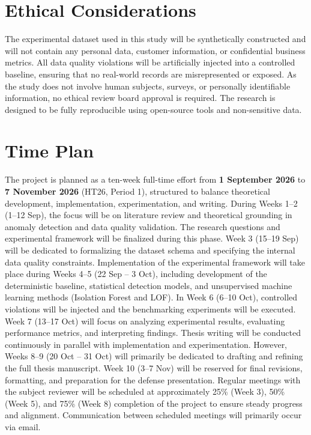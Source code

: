 \documentclass[a4paper, 12pt]{article} %
\begin{document}
\section{Ethical Considerations}
The experimental dataset used in this study will be synthetically constructed and will not contain any personal data, customer information, or confidential business metrics. All data quality violations will be artificially injected into a controlled baseline, ensuring that no real-world records are misrepresented or exposed. As the study does not involve human subjects, surveys, or personally identifiable information, no ethical review board approval is required. The research is designed to be fully reproducible using open-source tools and non-sensitive data.
\section{Time Plan}
The project is planned as a ten-week full-time effort from \textbf{1 September 2026} to \textbf{7 November 2026} (HT26, Period 1), structured to balance theoretical development, implementation, experimentation, and writing.
During Weeks 1--2 (1--12 Sep), the focus will be on literature review and theoretical grounding in anomaly detection and data quality validation. The research questions and experimental framework will be finalized during this phase. Week 3 (15--19 Sep) will be dedicated to formalizing the dataset schema and specifying the internal data quality constraints.
Implementation of the experimental framework will take place during Weeks 4--5 (22 Sep -- 3 Oct), including development of the deterministic baseline, statistical detection models, and unsupervised machine learning methods (Isolation Forest and LOF). In Week 6 (6--10 Oct), controlled violations will be injected and the benchmarking experiments will be executed. Week 7 (13--17 Oct) will focus on analyzing experimental results, evaluating performance metrics, and interpreting findings.
Thesis writing will be conducted continuously in parallel with implementation and experimentation. However, Weeks 8--9 (20 Oct -- 31 Oct) will primarily be dedicated to drafting and refining the full thesis manuscript. Week 10 (3--7 Nov) will be reserved for final revisions, formatting, and preparation for the defense presentation.
Regular meetings with the subject reviewer will be scheduled at approximately 25\% (Week 3), 50\% (Week 5), and 75\% (Week 8) completion of the project to ensure steady progress and alignment. Communication between scheduled meetings will primarily occur via email.
\end{document}
